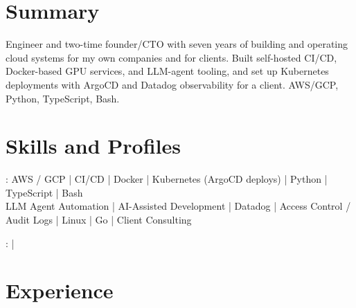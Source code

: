 \documentclass[print]{jack-resume}
\begin{document}
\pagecolor{darkmodeBackground}


\begin{minipage}[t][1cm][t]{.03\textwidth}
    \hfill
\end{minipage}

\section{Summary}
Engineer and two-time founder/CTO with seven years of building and operating cloud systems for my own companies and for clients. Built self-hosted CI/CD, Docker-based GPU services, and LLM-agent tooling, and set up Kubernetes deployments with ArgoCD and Datadog observability for a client. AWS/GCP, Python, TypeScript, Bash.
\sectionsep

\section{Skills and Profiles}
:
AWS / GCP \hfill | \hfill
CI/CD \hfill | \hfill
Docker \hfill | \hfill
Kubernetes (ArgoCD deploys) \hfill | \hfill
Python \hfill | \hfill
TypeScript \hfill | \hfill
Bash \\
\hspace{1.0cm} LLM Agent Automation \hfill | \hfill
AI-Assisted Development \hfill | \hfill
Datadog \hfill | \hfill
Access Control / Audit Logs \hfill | \hfill
Linux \hfill | \hfill
Go \hfill | \hfill
Client Consulting \\

\raggedright{
    :
      \href{https://www.linkedin.com/in/jack-sturtevant/}{ \ExternalLink} |
     \href{https://github.com/jacksturt}{ \ExternalLink}}

\section{Experience}
\end{document}
